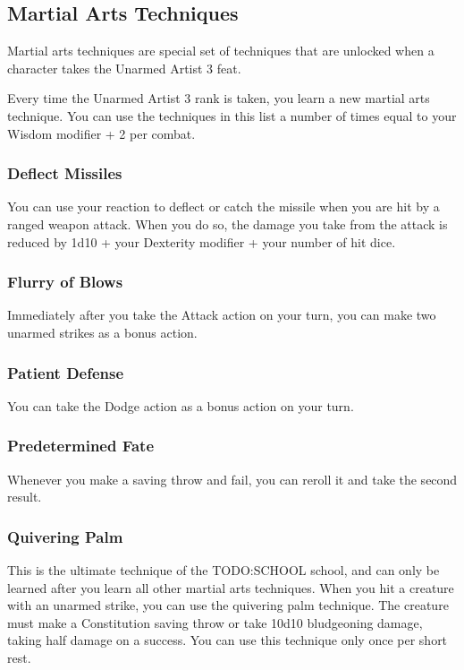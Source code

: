 \subsection*{Martial Arts Techniques} \label{tec::martialartstechniques}
Martial arts techniques are special set of techniques that are unlocked when a character takes the Unarmed Artist 3 feat.

Every time the Unarmed Artist 3 rank is taken, you learn a new martial arts technique.
You can use the techniques in this list a number of times equal to your Wisdom modifier + 2 per combat.

\subsubsection{Deflect Missiles} \label{mtec::deflectmissiles}
You can use your reaction to deflect or catch the missile when you are hit by a ranged weapon attack.
When you do so, the damage you take from the attack is reduced by 1d10 + your Dexterity modifier + your number of hit dice.

\subsubsection{Flurry of Blows} \label{mtec::flurryofblows}
Immediately after you take the Attack action on your turn, you can make two unarmed strikes as a bonus action.

\subsubsection{Patient Defense} \label{mtec::patientdefense}
You can take the Dodge action as a bonus action on your turn.

\subsubsection{Predetermined Fate} \label{mtec::predeterminedfate}
Whenever you make a saving throw and fail, you can reroll it and take the second result.

\subsubsection{Quivering Palm} \label{mtec::quiveringpalm}
This is the ultimate technique of the TODO:SCHOOL school, and can only be learned after you learn all other martial arts techniques.
When you hit a creature with an unarmed strike, you can use the quivering palm technique.
The creature must make a Constitution saving throw or take 10d10 bludgeoning damage, taking half damage on a success.
You can use this technique only once per short rest.


